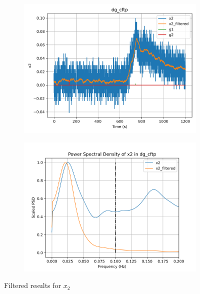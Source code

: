\begin{figure}[H]

\begin{minipage}{0.49\textwidth}
        \begin{figure}[H]
                \centering
                \includegraphics[width = \textwidth]{./figs/tst_filt/dg_cftp/x2.png}
        \end{figure}
\end{minipage}
\begin{minipage}{0.49\textwidth}
        \begin{figure}[H]
                \centering
                \includegraphics[width = \textwidth]{./figs/tst_filt/dg_cftp/x2_psd.png}
        \end{figure}
\end{minipage}
\caption{Filtered results for $x_2$}

\end{figure}


